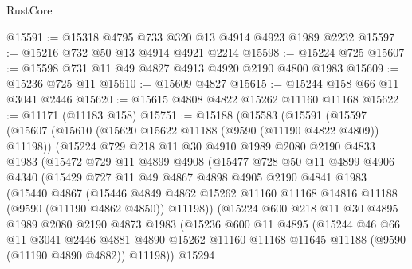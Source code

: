 \begin{lexlean}{RustCore}
\begin{coremodule}
@15591 := @15318 @4795 @733 @320 @13 @4914 @4923 @1989 @2232
@15597 := @15216 @732 @50 @13 @4914 @4921 @2214
@15598 := @15224 @725
@15607 := @15598 @731 @11 @49 @4827 @4913 @4920 @2190 @4800 @1983
@15609 := @15236 @725 @11
@15610 := @15609 @4827
@15615 := @15244 @158 @66 @11 @3041 @2446
@15620 := @15615 @4808 @4822 @15262 @11160 @11168
@15622 := @11171 (@11183 @158)
@15751 := @15188
    (@15583
      (@15591
        (@15597
          (@15607
            (@15610 (@15620 @15622 @11188 (@9590 (@11190 @4822 @4809)) @11198))
            (@15224
              @729
              @218
              @11
              @30
              @4910
              @1989
              @2080
              @2190
              @4833
              @1983
              (@15472
                @729
                @11
                @4899
                @4908
                (@15477
                  @728
                  @50
                  @11
                  @4899
                  @4906
                  @4340
                  (@15429
                    @727
                    @11
                    @49
                    @4867
                    @4898
                    @4905
                    @2190
                    @4841
                    @1983
                    (@15440
                      @4867
                      (@15446
                        @4849
                        @4862
                        @15262
                        @11160
                        @11168
                        @14816
                        @11188
                        (@9590 (@11190 @4862 @4850))
                        @11198))
                    (@15224
                      @600
                      @218
                      @11
                      @30
                      @4895
                      @1989
                      @2080
                      @2190
                      @4873
                      @1983
                      (@15236
                        @600
                        @11
                        @4895
                        (@15244
                          @46
                          @66
                          @11
                          @3041
                          @2446
                          @4881
                          @4890
                          @15262
                          @11160
                          @11168
                          @11645
                          @11188
                          (@9590 (@11190 @4890 @4882))
                          @11198))
                      @15294

\end{coremodule}
\end{lexlean}
